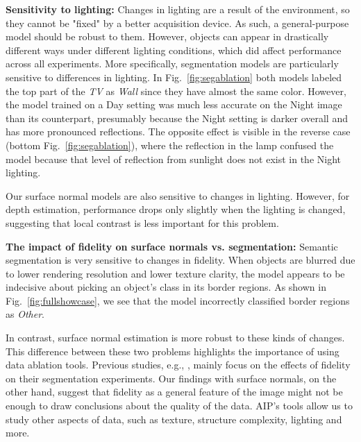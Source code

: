 \documentclass[runningheads]{llncs}
\begin{document}
\noindent\textbf{Sensitivity to lighting:} Changes in lighting are a result of the environment, so they cannot be "fixed" by a better acquisition device. As such, a general-purpose model should be robust to them. However, objects can appear in drastically different ways under different lighting conditions, which did affect performance across all experiments. More specifically, segmentation models are particularly sensitive to differences in lighting. In Fig.~\ref{fig:segablation} both models labeled the top part of the \textit{TV} as \textit{Wall} since they have almost the same color. However, the model trained on a Day setting was much less accurate on the Night image than its counterpart, presumably because the Night setting is darker overall and has more pronounced reflections. The opposite effect is visible in the reverse case (bottom Fig.~\ref{fig:segablation}), where the reflection in the lamp confused the model because that level of reflection from sunlight does not exist in the Night lighting.

Our surface normal models are also sensitive to changes in lighting. However, for depth estimation, performance drops only slightly when the lighting is changed, suggesting that local contrast is less important for this problem.





\vspace{0.5em}
\noindent\textbf{The impact of fidelity on surface normals vs. segmentation:} Semantic segmentation is very sensitive to changes in fidelity. When objects are blurred due to lower rendering resolution and lower texture clarity, the model appears to be indecisive about picking an object's class in its border regions. As shown in Fig.~\ref{fig:fullshowcase}, we see that the model incorrectly classified border regions as \textit{Other}.

In contrast, surface normal estimation is more robust to these kinds of changes. This difference between these two problems highlights the importance of using data ablation tools. Previous studies, e.g., \cite{7926706_photo_realism, Photorealism2, photorealism3}, mainly focus on the effects of fidelity on their segmentation experiments. Our findings with surface normals, on the other hand, suggest that fidelity as a general feature of the image might not be enough to draw conclusions about the quality of the data. AIP's tools allow us to study other aspects of data, such as texture, structure complexity, lighting and more.
\end{document}

